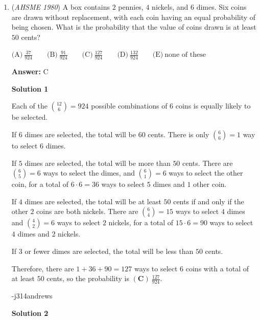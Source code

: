 \begin{enumerate}
 Substituting $d = \sqrt{6}$ into $(\textrm{vi})$ yields $\sqrt{6}a = 15$, so $a = \frac{15}{\sqrt{6}} = \frac{5\sqrt{6}}{2}$.

 Substituting $a = \frac{5\sqrt{6}}{2}$ yields  $r^2 = \left(\frac{5\sqrt{6}}{2}\right)^2 + 100 = \frac{275}{2}$, so $r = \sqrt{\frac{275}{2}} = \boxed{(\textbf{D})\ \frac{5\sqrt{22}}{2}}$



	\item (\textit{AHSME 1980}) A box contains $2$ pennies, $4$ nickels, and $6$ dimes. Six coins are drawn without replacement, 
with each coin having an equal probability of being chosen. What is the probability that the value of coins drawn is at least $50$ cents? 


 $\text{(A)} \ \frac{37}{924} \qquad  \text{(B)} \ \frac{91}{924} \qquad  \text{(C)} \ \frac{127}{924} \qquad  \text{(D)}\ \frac{132}{924}\qquad \text{(E)}\ \text{none of these}$

 \textbf{Answer: }C



\textbf{Solution 1}

Each of the $\binom{12}{6} = 924$ possible combinations of $6$ coins is equally likely to be selected.

 If $6$ dimes are selected, the total will be $60$ cents.  There is only $\binom{6}{6} = 1$ way to select $6$ dimes.

 If $5$ dimes are selected, the total will be more than $50$ cents.  There are $\binom{6}{5} = 6$ ways to select the dimes, and $\binom{6}{1} = 6$ ways to select the other coin, for a total of $6 \cdot 6 = 36$ ways to select $5$ dimes and $1$ other coin.

 If $4$ dimes are selected, the total will be at least $50$ cents if and only if the other $2$ coins are both nickels.  There are $\binom{6}{4} = 15$ ways to select $4$ dimes and $\binom{4}{2} = 6$ ways to select $2$ nickels, for a total of $15 \cdot 6 = 90$ ways to select $4$ dimes and $2$ nickels.

 If $3$ or fewer dimes are selected, the total will be less than $50$ cents.

 Therefore, there are $1+36+90=127$ ways to select $6$ coins with a total of at least $50$ cents, so the probability is $\boxed{(\textbf{C})\ \frac{127}{924}}$.

 -j314andrews

 



\textbf{Solution 2}


\end{enumerate}
